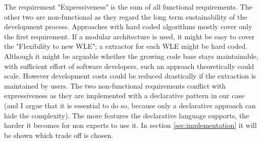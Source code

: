 The requirement "Expressiveness" is the sum of all functional requirements. The other two are non-functional as they regard the long term sustainability of the development process.
Approaches with hard coded algorithms mostly cover only the first requirement. If a modular architecture is used, it might be easy to cover the "Flexibility to new WLE"; a extractor for each WLE might be hard coded. Although it might be arguable whether the growing code base stays maintainable, with sufficient effort of software developers, such an approach theoretically could scale. However development costs could be reduced drastically if the extraction is maintained by users. The two non-functional requirements conflict with expressiveness as they are implemented with a declarative pattern in our case (and I argue that it is essential to do so, because only a declarative approach can hide the complexity). The more features the declarative language supports, the harder it becomes for non experts to use it. In section \ref{sec:implementation} it will be shown which trade off is chosen. 

\newpage
